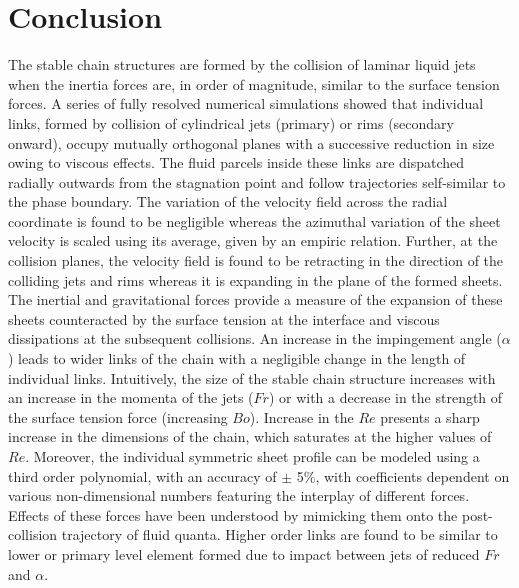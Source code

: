 \documentclass[%
 aip,
 sd,%
amsmath,amssymb,
preprint,%
author-year,%
]{revtex4-1}
\begin{document}
\section{Conclusion}
The stable chain structures are formed by the collision of laminar liquid jets when the inertia forces are, in order of magnitude, similar to the surface tension forces. A series of fully resolved numerical simulations showed that individual links, formed by collision of cylindrical jets (primary) or rims (secondary onward), occupy mutually orthogonal planes with a successive reduction in size owing to viscous effects. The fluid parcels inside these links are dispatched radially outwards from the stagnation point and follow trajectories self-similar to the phase boundary. The variation of the velocity field across the radial coordinate is found to be negligible whereas the azimuthal variation of the sheet velocity is scaled using its average, given by an empiric relation. Further, at the collision planes, the velocity field is found to be retracting in the direction of the colliding jets and rims whereas it is expanding in the plane of the formed sheets. The inertial and gravitational forces provide a measure of the expansion of these sheets counteracted by the surface tension at the interface and viscous dissipations at the subsequent collisions. An increase in the impingement angle ($\alpha$) leads to wider links of the chain with a negligible change in the length of individual links. Intuitively, the size of the stable chain structure increases with an increase in the momenta of the jets ($Fr$) or with a decrease in the strength of the surface tension force (increasing $Bo$). Increase in the $Re$ presents a sharp increase in the dimensions of the chain, which saturates at the higher values of $Re$. Moreover, the individual symmetric sheet profile can be modeled using a third order polynomial, with an accuracy of $\pm$ 5\%, with coefficients dependent on various non-dimensional numbers featuring the interplay of different forces. Effects of these forces have been understood by mimicking them onto the post-collision trajectory of fluid quanta. Higher order links are found to be similar to lower or primary level element formed due to impact between jets of reduced $Fr$ and $\alpha$. 

\end{document}
